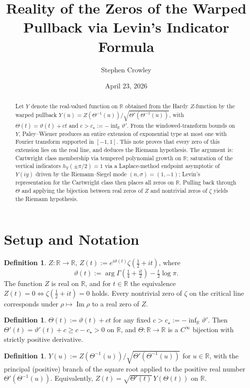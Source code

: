 \documentclass[11pt,a4paper]{article}
\title{Reality of the Zeros of the Warped Pullback via Levin's Indicator Formula}
\author{Stephen Crowley}
\date{April 23, 2026}
\theoremstyle{plain}
\theoremstyle{definition}
\newtheorem{definition}[theorem]{Definition}
\newcommand{\R}{\mathbb{R}}
\DeclareMathOperator{\Imag}{Im}
\begin{document}
\maketitle

\begin{abstract}
Let $Y$ denote the real-valued function on $\R$ obtained from the Hardy $Z$-function by the warped pullback $Y(u)=Z(\Theta^{-1}(u))/\sqrt{\Theta'(\Theta^{-1}(u))}$, with $\Theta(t)=\vartheta(t)+ct$ and $c>c_\star:=-\inf_\R\vartheta'$. From the windowed-transform bounds on $Y$, Paley--Wiener produces an entire extension of exponential type at most one with Fourier transform supported in $[-1,1]$. This note proves that every zero of this extension lies on the real line, and deduces the Riemann hypothesis. The argument is: Cartwright class membership via tempered polynomial growth on $\R$; saturation of the vertical indicators $h_Y(\pm\pi/2)=1$ via a Laplace-method endpoint asymptotic of $Y(iy)$ driven by the Riemann--Siegel mode $(n,\sigma)=(1,-1)$; Levin's representation for the Cartwright class then places all zeros on $\R$. Pulling back through $\Theta$ and applying the bijection between real zeros of $Z$ and nontrivial zeros of $\zeta$ yields the Riemann hypothesis.
\end{abstract}

\section{Setup and Notation}

\begin{definition}\label{def:Z}
$Z:\R\to\R$, $Z(t):=e^{i\vartheta(t)}\zeta(\tfrac12+it)$, where
\[
\vartheta(t):=\arg\Gamma\!\left(\tfrac14+\tfrac{it}{2}\right)-\tfrac{t}{2}\log\pi.
\]
The function $Z$ is real on $\R$, and for $t\in\R$ the equivalence $Z(t)=0\iff\zeta(\tfrac12+it)=0$ holds. Every nontrivial zero of $\zeta$ on the critical line corresponds under $\rho\mapsto\Imag\rho$ to a real zero of $Z$.
\end{definition}

\begin{definition}\label{def:Theta}
$\Theta(t):=\vartheta(t)+ct$ for any fixed $c>c_\star:=-\inf_\R\vartheta'$. Then $\Theta'(t)=\vartheta'(t)+c\ge c-c_\star>0$ on $\R$, and $\Theta:\R\to\R$ is a $C^\infty$ bijection with strictly positive derivative.
\end{definition}

\begin{definition}\label{def:Y}
$Y(u):=Z(\Theta^{-1}(u))/\sqrt{\Theta'(\Theta^{-1}(u))}$ for $u\in\R$, with the principal (positive) branch of the square root applied to the positive real number $\Theta'(\Theta^{-1}(u))$. Equivalently, $Z(t)=\sqrt{\Theta'(t)}\,Y(\Theta(t))$ on $\R$.
\end{definition}
\end{document}
